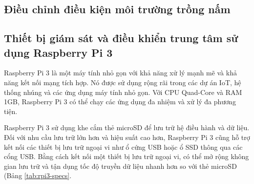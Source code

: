 \subsection{Điều chỉnh điều kiện môi trường trồng nấm}

\subsection{Thiết bị giám sát và điều khiển trung tâm sử dụng Raspberry Pi 3}

Raspberry Pi 3 là một máy tính nhỏ gọn với khả năng xử lý mạnh mẽ và khả năng kết nối mạng tích hợp. Nó được sử dụng rộng rãi trong các dự án IoT, hệ thống nhúng và các ứng dụng máy tính nhỏ gọn. Với CPU Quad-Core và RAM 1GB, Raspberry Pi 3 có thể chạy các ứng dụng đa nhiệm và xử lý đa phương tiện.

Raspberry Pi 3 sử dụng khe cắm thẻ microSD để lưu trữ hệ điều hành và dữ liệu. Đối với nhu cầu lưu trữ lớn hơn và hiệu suất cao hơn, Raspberry Pi 3 cũng hỗ trợ kết nối các thiết bị lưu trữ ngoại vi như ổ cứng USB hoặc ổ SSD thông qua các cổng USB. Bằng cách kết nối một thiết bị lưu trữ ngoại vi, có thể mở rộng không gian lưu trữ và tận dụng tốc độ truyền dữ liệu nhanh hơn so với thẻ microSD (Bảng \ref{tab:rpi3-specs}.

